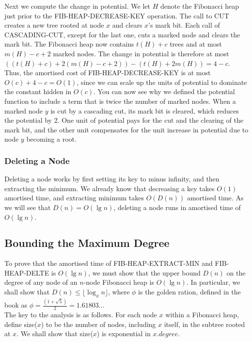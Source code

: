 \documentclass[12pt]{article}
\begin{document}
Next we compute the change in potential. We let $H$ denote the Fibonacci heap just prior to the FIB-HEAP-DECREASE-KEY operation. The call to CUT creates a new tree rooted at node $x$ and clears $x$'s mark bit. Each call of CASCADING-CUT, except for the last one, cuts a marked node and clears the mark bit. The Fibonacci heap now contains $t(H) + c$ trees and at most $m(H) - c + 2$ marked nodes. The change in potential is therefore at most \\

$((t(H) + c) + 2(m(H) -c + 2)) - (t(H) + 2m(H)) = 4 - c$. \\

Thus, the amortised cost of FIB-HEAP-DECREASE-KEY is at most $O(c) + 4 - c = O(1)$, since we can scale up the units of potential to dominate the constant hidden in $O(c)$. You can now see why we defined the potential function to include a term that is twice the number of marked nodes. When a marked node $y$ is cut by a cascading cut, its mark bit is cleared, which reduces the potential by 2. One unit of potential pays for the cut and the clearing of the mark bit, and the other unit compensates for the unit increase in potential due to node $y$ becoming a root.
%
\subsubsection{Deleting a Node}
Deleting a node works by first setting its key to minus infinity, and then extracting the minimum. We already know that decreasing a key takes $O(1)$ amortised time, and extracting minimum takes $O(D(n))$ amortised time. As we will see that $D(n) = O(\lg n)$, deleting a node runs in amortised time of $O(\lg n)$.

\subsection{Bounding the Maximum Degree}
To prove that the amortised time of FIB-HEAP-EXTRACT-MIN and FIB-HEAP-DELTE is $O(\lg n)$, we must show that the upper bound $D(n)$ on the degree of any node of an $n$-node Fibonacci heap is $O(\lg n)$. In particular, we shall show that $D(n) \leq \lfloor \log_{\phi}n\rfloor$, where $\phi$ is the golden ration, defined in the book as $\phi = \frac{(1 + \sqrt{5})}{2} = 1.61803...$\\

The key to the analysis is as follows. For each node $x$ within a Fibonacci heap, define size($x$) to be the number of nodes, including $x$ itself, in the subtree rooted at $x$. We shall show that size($x$) is exponential in $x.degree$. \\
\end{document}
